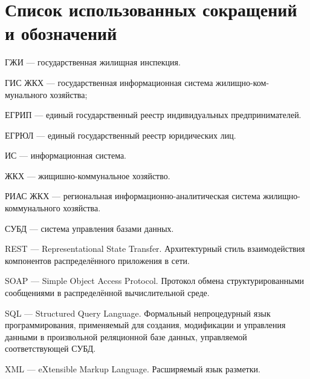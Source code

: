 \section*{Список использованных сокращений и обозначений}

ГЖИ --- государственная жилищная инспекция.

ГИС ЖКХ --- государственная информационная система жилищно-ком-\linebreak мунального хозяйства;

ЕГРИП --- единый государственный реестр индивидуальных предпринимателей.

ЕГРЮЛ --- единый государственный реестр юридических лиц.

ИС --- информационная система.

ЖКХ --- жищишно-коммунальное хозяйство.

РИАС ЖКХ --- региональная информационно-аналитическая система жилищно-коммунального хозяйства.

СУБД --- система управления базами данных.

REST --- Representational State Transfer. Архитектурный стиль взаимодействия компонентов распределённого приложения в сети.

SOAP --- Simple Object Access Protocol. Протокол обмена структурированными сообщениями в распределённой вычислительной среде.

SQL --- Structured Query Language. Формальный непроцедурный язык программирования, применяемый для создания, модификации и управления данными в произвольной реляционной базе данных, управляемой соответствующей СУБД.

XML --- eXtensible Markup Language. Расширяемый язык разметки.

\clearpage
\newpage